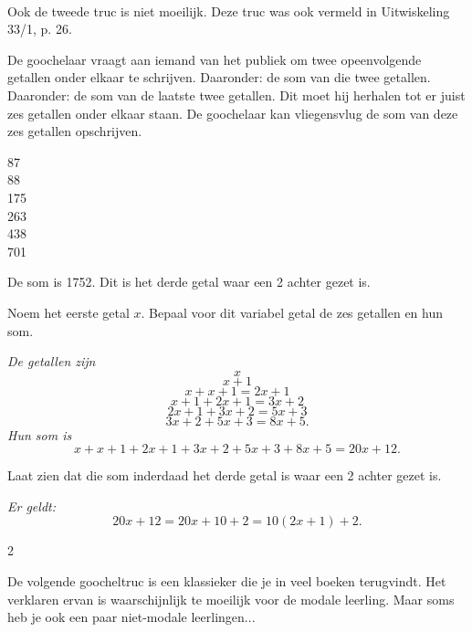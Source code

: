 \\Ook de tweede truc is niet moeilijk. Deze truc was ook vermeld in Uitwiskeling 33/1, p. 26.
\vspace{1cm}



De goochelaar vraagt aan iemand van het publiek om twee opeenvolgende getallen onder elkaar te schrijven. Daaronder: de som van die twee getallen. Daaronder: de som van de laatste twee getallen. Dit moet hij herhalen tot er juist zes getallen onder elkaar staan. De goochelaar kan vliegensvlug de som van deze zes getallen opschrijven.

\begin{center}
87\\
88\\
175\\
263\\
438\\
701   
\end{center}

De som is 1752. Dit is het derde getal waar een 2 achter gezet is.


\begin{werktekstoef}
\item {Noem het eerste getal $x$. Bepaal voor dit variabel getal de zes getallen en hun som.}

\emph{De getallen zijn}
$$x$$
$$x+1$$
$$x+x+1=2x+1$$
$$x+1+2x+1=3x+2$$
$$2x+1+3x+2=5x+3$$
$$3x+2+5x+3=8x+5.$$
\emph{Hun som is} $$x+x+1+2x+1+3x+2+5x+3+8x+5=20x+12.$$

\item{Laat zien dat die som inderdaad het derde getal is waar een 2 achter gezet is.}

\emph{Er geldt:}
$$20x+12=20x+10+2=10(2x+1)+2.$$
\end{werktekstoef}
\eindewerktekst

\begin{multicols}{2}

De volgende goocheltruc is een klassieker die je in veel boeken terugvindt. Het verklaren ervan is waarschijnlijk te moeilijk voor de modale leerling. Maar soms heb je ook een paar niet-modale leerlingen...

\end{multicols}



